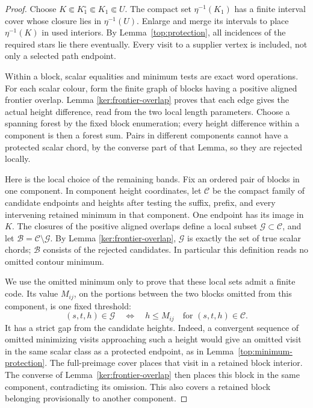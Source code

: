 \begin{proof}
Choose \(K\Subset K_1^\circ\Subset K_1\Subset U\).
The compact set \(\eta^{-1}(K_1)\) has a finite interval cover whose
closure lies in \(\eta^{-1}(U)\).  Enlarge and merge its intervals to
place \(\eta^{-1}(K)\) in used interiors.  By Lemma~\ref{top:protection}, all
incidences of the required stars lie there eventually.  Every visit
to a supplier vertex is included, not only a selected path endpoint.

Within a block, scalar equalities and minimum tests are exact word
operations.  For each scalar colour, form the finite graph of blocks
having a positive aligned frontier overlap.  Lemma
\ref{ker:frontier-overlap} proves that each edge gives the actual
height difference, read from the two local length parameters.
Choose a spanning forest by the fixed block enumeration; every
height difference within a component is then a forest sum.
Pairs in different components cannot have a protected scalar chord,
by the converse part of that Lemma, so they are rejected locally.

Here is the local choice of the remaining bands.  Fix an ordered
pair of blocks in one component.  In component height coordinates,
let \(\mathcal C\) be the compact family of candidate endpoints and
heights after testing the suffix, prefix, and every intervening
retained minimum in that component.  One endpoint has its image
in \(K\).  The closures of the positive aligned overlaps define a
local subset \(\mathcal G\subset\mathcal C\), and let
\(\mathcal B=\mathcal C\setminus\mathcal G\).  By Lemma
\ref{ker:frontier-overlap}, \(\mathcal G\) is exactly the set of true
scalar chords; \(\mathcal B\) consists of the rejected candidates.
In particular this definition reads no omitted contour minimum.

We use the omitted minimum only to prove that these local sets admit
a finite code.  Its value \(M_{ij}\), on the portions between the two
blocks omitted from this component, is one fixed threshold:
\[
 (s,t,h)\in\mathcal G\quad\Longleftrightarrow\quad h\le M_{ij}
 \quad\text{for }(s,t,h)\in\mathcal C.
\]
It has a strict gap from the candidate heights.  Indeed, a convergent
sequence of omitted minimizing visits approaching such a height
would give an omitted visit in the same scalar class as a protected
endpoint, as in Lemma~\ref{top:minimum-protection}.  The full-preimage
cover places that visit in a retained block interior.  The converse
of Lemma~\ref{ker:frontier-overlap} then places this block in the same
component, contradicting its omission.  This also covers a retained
block belonging provisionally to another component.


\end{proof}

